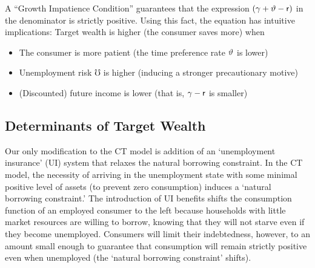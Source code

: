 \documentclass[titlepage]{\econtex}
\begin{document}
A ``Growth Impatience Condition'' guarantees that the expression $(\gamma+\vartheta-\mathsf{r})$ in the denominator is strictly positive.  Using this fact, the equation has intuitive implications:  Target wealth is higher (the consumer saves more) when
\begin{itemize}
\item The consumer is more patient  (the time preference rate $\vartheta$ is lower)
  \item Unemployment risk $\mho$ is higher (inducing a stronger precautionary motive)
\item (Discounted) future income is lower (that is, $\gamma-\mathsf{r}$ is smaller)
  \end{itemize}


  \hypertarget{Determinants-of-Target-Wealth}{}

\subsection{Determinants of Target Wealth} \label{ssCfunction}

Our only modification to the CT model is addition of an `unemployment insurance' (UI) system that relaxes the natural borrowing constraint. %
 In the CT model, the necessity of arriving in the unemployment state with some minimal positive level of assets (to prevent zero consumption) induces a `natural borrowing constraint.'  The introduction of UI benefits shifts the consumption function of an employed consumer to the left because households with little market resources are willing to borrow, knowing that they will not starve even if they become unemployed. Consumers will limit their indebtedness, however, to an amount small enough to guarantee that consumption will remain strictly positive even when unemployed (the `natural borrowing constraint' shifts).%
 
\end{document}
